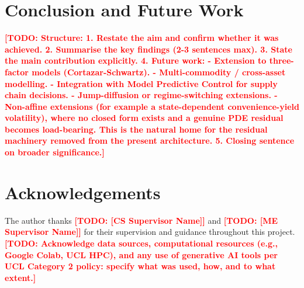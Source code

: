 \documentclass[11pt, a4paper]{article}
\newcommand{\todo}[1]{\textcolor{red}{\textbf{[TODO: #1]}}}
\begin{document}

\section{Conclusion and Future Work}
\label{sec:conclusion}

\todo{Structure:
  1. Restate the aim and confirm whether it was achieved.
  2. Summarise the key findings (2-3 sentences max).
  3. State the main contribution explicitly.
  4. Future work:
     - Extension to three-factor models (Cortazar-Schwartz).
     - Multi-commodity / cross-asset modelling.
     - Integration with Model Predictive Control for supply chain decisions.
     - Jump-diffusion or regime-switching extensions.
     - Non-affine extensions (for example a state-dependent convenience-yield
       volatility), where no closed form exists and a genuine PDE residual
       becomes load-bearing. This is the natural home for the residual
       machinery removed from the present architecture.
  5. Closing sentence on broader significance.}



\section*{Acknowledgements}

The author thanks \todo{[CS Supervisor Name]} and \todo{[ME Supervisor Name]}
for their supervision and guidance throughout this project. \todo{Acknowledge
data sources, computational resources (e.g., Google Colab, UCL HPC), and any
use of generative AI tools per UCL Category 2 policy: specify what was used,
how, and to what extent.}


\end{document}
